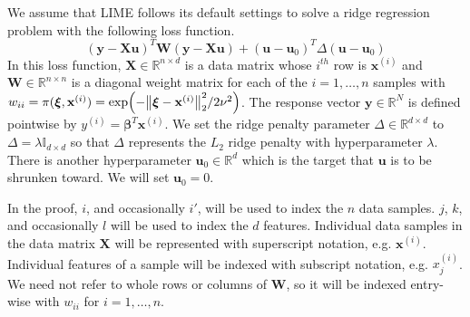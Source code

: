 \documentclass[mnsc,blindrev]{informs3}
\begin{document}
        We assume that LIME follows its default settings to solve a ridge regression problem with the following loss function.
        \begin{equation*}
            (\mathbf{y} - \mathbf{X}\mathbf{u})^T \mathbf{W}(\mathbf{y} - \mathbf{X}\mathbf{u}) + (\mathbf{u} - \mathbf{u}_0)^T \Delta(\mathbf{u} - \mathbf{u}_0)
        \end{equation*}
        In this loss function, $\mathbf{X} \in \mathbb{R}^{n\times d}$ is a data matrix  whose $i^{th}$ row is $\mathbf{x}^{(i)}$ and $\mathbf{W} \in \mathbb{R}^{n\times n}$ is a diagonal weight matrix for each of the $i=1,\ldots,n$ samples with $w_{ii} = \pi(\boldsymbol{\xi},\mathbf{x}^{(i)}) = \exp(-\norm{\boldsymbol{\xi} - \mathbf{x}^{(i)}}_2^2/2\nu^2)$. The response vector $\mathbf{y}\in \mathbb{R}^N$ is defined pointwise by $y^{(i)} = \boldsymbol{\beta}^T \mathbf{x}^{(i)}$. We set the ridge penalty parameter $\Delta\in \mathbb{R}^{d\times d}$ to $\Delta = \lambda \mathds{I}_{d\times d}$ so that $\Delta$ represents the $L_2$ ridge penalty with hyperparameter $\lambda$. There is another hyperparameter $\mathbf{u}_0 \in \mathbb{R}^d$ which is the target that $\mathbf{u}$ is to be shrunken toward.  We will set $\mathbf{u}_0 = 0$.

        In the proof, $i$, and occasionally $i'$, will be used to index the $n$ data samples. $j$, $k$, and occasionally $l$ will be used to index the $d$ features. Individual data samples in the data matrix $\mathbf{X}$ will be represented with superscript notation, e.g. $\mathbf{x}^{(i)}$. Individual features of a sample will be indexed with subscript notation, e.g. $x^{(i)}_j$. We need not refer to whole rows or columns of $\mathbf{W}$, so it will be indexed entry-wise with $w_{ii}$ for $i=1,\ldots,n$.
    
    
\end{document}
